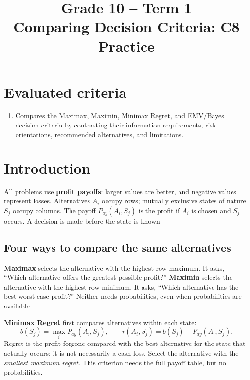 \makeatletter
{}
\makeatother


\title{Grade 10 -- Term 1\\Comparing Decision Criteria: C8 Practice}
\author{}
\date{}


\maketitle
\setcounter{tocdepth}{1}
\setcounter{secnumdepth}{2}
\label{toc}
\tableofcontents

\section*{Evaluated criteria}
\begin{enumerate}[label=\textbf{C\arabic*},start=8]
\item Compares the Maximax, Maximin, Minimax Regret, and EMV/Bayes decision criteria by contrasting their information requirements, risk orientations, recommended alternatives, and limitations.
\end{enumerate}

\section{Introduction}\label{sec:c8-introduction}
All problems use \textbf{profit payoffs}: larger values are better, and negative values represent losses. Alternatives $A_i$ occupy rows; mutually exclusive states of nature $S_j$ occupy columns. The payoff $P_{ay}(A_i,S_j)$ is the profit if $A_i$ is chosen and $S_j$ occurs. A decision is made before the state is known.

\subsection{Four ways to compare the same alternatives}
\textbf{Maximax} selects the alternative with the highest row maximum. It asks, ``Which alternative offers the greatest possible profit?'' \textbf{Maximin} selects the alternative with the highest row minimum. It asks, ``Which alternative has the best worst-case profit?'' Neither needs probabilities, even when probabilities are available.

\textbf{Minimax Regret} first compares alternatives within each state:
\[
b(S_j)=\max_i P_{ay}(A_i,S_j),\qquad
r(A_i,S_j)=b(S_j)-P_{ay}(A_i,S_j).
\]
Regret is the profit forgone compared with the best alternative for the state that actually occurs; it is not necessarily a cash loss. Select the alternative with the \emph{smallest maximum regret}. This criterion needs the full payoff table, but no probabilities.

